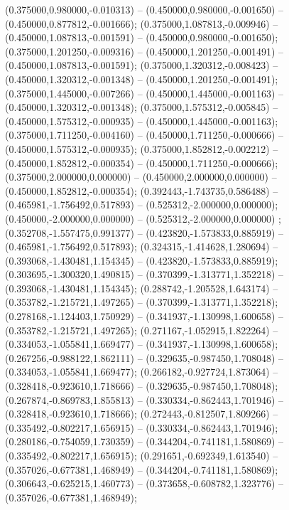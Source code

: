  (0.375000,0.980000,-0.010313) -- (0.450000,0.980000,-0.001650) -- (0.450000,0.877812,-0.001666);
 (0.375000,1.087813,-0.009946) -- (0.450000,1.087813,-0.001591) -- (0.450000,0.980000,-0.001650);
 (0.375000,1.201250,-0.009316) -- (0.450000,1.201250,-0.001491) -- (0.450000,1.087813,-0.001591);
 (0.375000,1.320312,-0.008423) -- (0.450000,1.320312,-0.001348) -- (0.450000,1.201250,-0.001491);
 (0.375000,1.445000,-0.007266) -- (0.450000,1.445000,-0.001163) -- (0.450000,1.320312,-0.001348);
 (0.375000,1.575312,-0.005845) -- (0.450000,1.575312,-0.000935) -- (0.450000,1.445000,-0.001163);
 (0.375000,1.711250,-0.004160) -- (0.450000,1.711250,-0.000666) -- (0.450000,1.575312,-0.000935);
 (0.375000,1.852812,-0.002212) -- (0.450000,1.852812,-0.000354) -- (0.450000,1.711250,-0.000666);
 (0.375000,2.000000,0.000000) -- (0.450000,2.000000,0.000000) -- (0.450000,1.852812,-0.000354);
 (0.392443,-1.743735,0.586488) -- (0.465981,-1.756492,0.517893) -- (0.525312,-2.000000,0.000000);
 (0.450000,-2.000000,0.000000) -- (0.525312,-2.000000,0.000000) ;
 (0.352708,-1.557475,0.991377) -- (0.423820,-1.573833,0.885919) -- (0.465981,-1.756492,0.517893);
 (0.324315,-1.414628,1.280694) -- (0.393068,-1.430481,1.154345) -- (0.423820,-1.573833,0.885919);
 (0.303695,-1.300320,1.490815) -- (0.370399,-1.313771,1.352218) -- (0.393068,-1.430481,1.154345);
 (0.288742,-1.205528,1.643174) -- (0.353782,-1.215721,1.497265) -- (0.370399,-1.313771,1.352218);
 (0.278168,-1.124403,1.750929) -- (0.341937,-1.130998,1.600658) -- (0.353782,-1.215721,1.497265);
 (0.271167,-1.052915,1.822264) -- (0.334053,-1.055841,1.669477) -- (0.341937,-1.130998,1.600658);
 (0.267256,-0.988122,1.862111) -- (0.329635,-0.987450,1.708048) -- (0.334053,-1.055841,1.669477);
 (0.266182,-0.927724,1.873064) -- (0.328418,-0.923610,1.718666) -- (0.329635,-0.987450,1.708048);
 (0.267874,-0.869783,1.855813) -- (0.330334,-0.862443,1.701946) -- (0.328418,-0.923610,1.718666);
 (0.272443,-0.812507,1.809266) -- (0.335492,-0.802217,1.656915) -- (0.330334,-0.862443,1.701946);
 (0.280186,-0.754059,1.730359) -- (0.344204,-0.741181,1.580869) -- (0.335492,-0.802217,1.656915);
 (0.291651,-0.692349,1.613540) -- (0.357026,-0.677381,1.468949) -- (0.344204,-0.741181,1.580869);
 (0.306643,-0.625215,1.460773) -- (0.373658,-0.608782,1.323776) -- (0.357026,-0.677381,1.468949);
